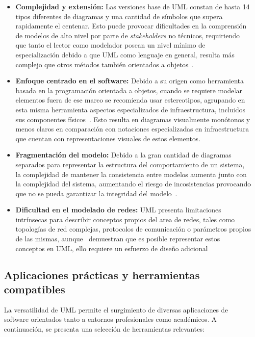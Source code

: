 \begin{itemize}
	\item \textbf{Complejidad y extensión:} Las versiones base de UML constan de hasta 14 tipos diferentes de diagramas y una cantidad de símbolos que supera rapidamente el centenar. Esto puede provocar dificultades en la comprensión de modelos de alto nivel por parte de \textit{stakeholders} no técnicos, requiriendo que tanto el lector como modelador posean un nivel mínimo de especialización debido a que UML como lenguaje en general, resulta más complejo que otros métodos también orientados a objetos~\cite{Siau2001}.
	\item \textbf{Enfoque centrado en el software:} Debido a su origen como herramienta basada en la programación orientada a objetos, cuando se requiere modelar elementos fuera de ese marco se recomienda usar estereotipos, agrupando en esta misma herramienta aspectos especializados de infraestructura, incluidos sus componentes físicos~\cite{Ambler_2005}. Esto resulta en diagramas visualmente monótonos y menos claros en comparación con notaciones especializadas en infraestructura que cuentan con representaciones visuales de estos elementos.
	\item \textbf{Fragmentación del modelo:} Debido a la gran cantidad de diagramas separados para representar la estructura del comportamiento de un sistema, la complejidad de mantener la consistencia entre modelos aumenta junto con la complejidad del sistema, aumentando el riesgo de incosistencias provocando que no se pueda garantizar la integridad del modelo~\cite{Booch01}.
	\item \textbf{Dificultad en el modelado de redes:} UML presenta limitaciones intrínsecas para describir conceptos propios del area de redes, tales como topologías de red complejas, protocolos de comunicación o parámetros propios de las mismas, aunque~\cite{Saxena} demuestran que es posible representar estos conceptos en UML, ello requiere un esfuerzo de diseño adicional
\end{itemize}

\subsection{Aplicaciones prácticas y herramientas compatibles}

La versatilidad de UML permite el surgimiento de diversas aplicaciones de software orientados tanto a entornos profesionales como académicos. A continuación, se presenta una selección de herramientas relevantes:

